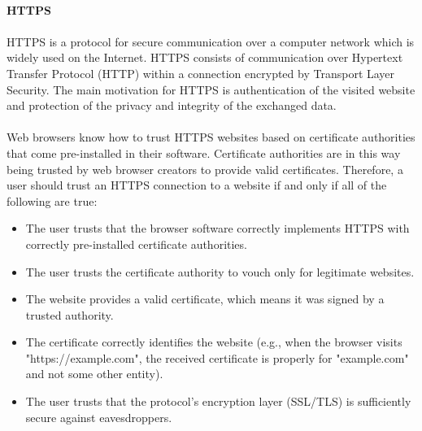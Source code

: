 \paragraph{}\textbf{HTTPS}
\paragraph{}
HTTPS is a protocol for secure communication over a computer network which is widely used on the Internet. HTTPS consists of communication over Hypertext Transfer Protocol (HTTP) within a connection encrypted by Transport Layer Security. The main motivation for HTTPS is authentication of the visited website and protection of the privacy and integrity of the exchanged data.
\paragraph{}
Web browsers know how to trust HTTPS websites based on certificate authorities that come pre-installed in their software. Certificate authorities are in this way being trusted by web browser creators to provide valid certificates. Therefore, a user should trust an HTTPS connection to a website if and only if all of the following are true:
\begin{itemize}
\item The user trusts that the browser software correctly implements HTTPS with correctly pre-installed certificate authorities.
\item The user trusts the certificate authority to vouch only for legitimate websites.
\item The website provides a valid certificate, which means it was signed by a trusted authority.
\item The certificate correctly identifies the website (e.g., when the browser visits "https://example.com", the received certificate is properly for "example.com" and not some other entity).
\item The user trusts that the protocol's encryption layer (SSL/TLS) is sufficiently secure against eavesdroppers.
\end{itemize}



